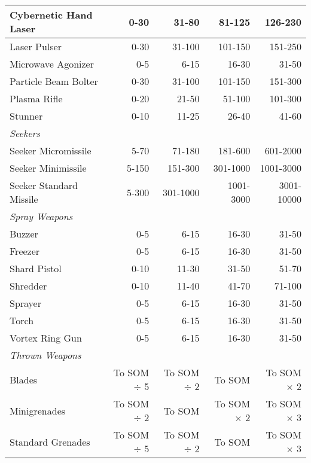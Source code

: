 \begin{table}
\begin{tabularx}{\textwidth}{|X|r|r|r|r|}
Cybernetic Hand Laser	&0-30	&31-80	&81-125	&126-230 \\ \hline

Laser Pulser	&0-30	&31-100	&101-150	&151-250 \\ \hline

Microwave Agonizer	&0-5	&6-15	&16-30	&31-50 \\ \hline

Particle Beam Bolter	&0-30	&31-100	&101-150	&151-300 \\ \hline

Plasma Rifle	&0-20	&21-50	&51-100	&101-300 \\ \hline

Stunner	&0-10	&11-25	&26-40	&41-60 \\ \hline

\multicolumn{5}{|l|}{\emph{Seekers}} \\ \hline

Seeker Micromissile	&5-70	&71-180	&181-600	&601-2000 \\ \hline

Seeker Minimissile	&5-150	&151-300	&301-1000	&1001-3000 \\ \hline

Seeker Standard Missile	&5-300	&301-1000	&1001-3000	&3001-10000 \\ \hline

\multicolumn{5}{|l|}{\emph{Spray Weapons}} \\ \hline

Buzzer	&0-5	&6-15	&16-30	&31-50\\ \hline

Freezer	&0-5	&6-15	&16-30	&31-50\\ \hline

Shard Pistol	&0-10	&11-30	&31-50	&51-70\\ \hline

Shredder	&0-10	&11-40	&41-70	&71-100\\ \hline

Sprayer	&0-5	&6-15	&16-30	&31-50\\ \hline

Torch	&0-5	&6-15	&16-30	&31-50\\ \hline

Vortex Ring Gun	&0-5	&6-15	&16-30	&31-50\\ \hline

\multicolumn{5}{|l|}{\emph{Thrown Weapons}} \\ \hline

Blades &To SOM $\div$ 5 &To SOM $\div$ 2 &To SOM &To SOM $\times$ 2 \\ \hline

Minigrenades &To SOM $\div$ 2 &To SOM &To SOM $\times$ 2 &To SOM $\times$ 3 \\ \hline

Standard Grenades &To SOM $\div$ 5 &To SOM $\div$ 2 &To SOM &To SOM $\times$ 3 \\ \hline

\end{tabularx} \end{table} 



